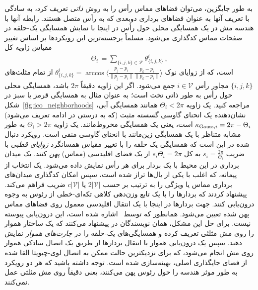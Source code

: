 به طور جایگزین، می‌توان فضاهای مماس رأس را به روش \emph{ذاتی} تعریف کرد، به سادگی با تعریف آنها به عنوان فضاهای برداری دوبعدی که به رأس متصل هستند.
رابطه آنها با هندسه مش در یک همسایگی محلی حول رأس در اینجا با نمایش همسایگی یک-حلقه در صفحات مماس کدگذاری می‌شود.
مسلماً برجسته‌ترین این رویکردها بر اساس تغییر مقیاس زاویه کل
\begin{align}\label{eq:mesh_total_incident_angle}
    \Theta_i \,=\! \sum_{\{i,j,k\}\in\mathcal{F}} \theta_{\{i,j,k\}}^i \,,
\end{align}
است، که از زوایای نوک
$\theta_{\{i,j,k\}}^i = \arccos \big\langle \frac{p_j-p_i}{\lVert p_j-p_i\rVert} \frac{p_k-p_i}{\lVert p_k-p_i\rVert} \big\rangle$
از تمام مثلث‌های $\{i,j,k\}$ مجاور رأس $i\in\mathcal{V}$ جمع می‌شود.
اگر این زاویه دقیقاً $2\pi$ باشد، همسایگی محلی حول رأس به طور ذاتی تخت است؛ به عنوان مثال به همسایگی قرمز یا سبز در شکل~\ref{fig:ico_neighborhoods} مراجعه کنید.
یک زاویه $\Theta_i < 2\pi$ همانند همسایگی آبی، نشان‌دهنده یک انحنای گاوسی گسسته مثبت (که به درستی در ادامه تعریف می‌شود) $\kappa_{\textup{Gauss},i} = 2\pi - \Theta_i$ است، یعنی یک همسایگی مخروط‌مانند.
یک زاویه $\Theta_i > 2\pi$ به طور مشابه متناظر با یک همسایگی زین‌مانند با انحنای گاوسی منفی است.
رویکرد دنبال شده در
\cite{polthier1998straightest,zhang2006vectorFieldDesign,Knoppel:2013:GOD,Sharp2019VectorHeatMethod,craneDiscreteDifferentialGeometry2014}
این است که همسایگی یک-حلقه را با تغییر مقیاس همسانگرد \emph{زوایای قطبی} با ضریب $s_i = \frac{2\pi}{\Theta_i}$ به کل $s_i \Theta_i = 2\pi$ از یک فضای اقلیدسی (مماس) \emph{پهن} کنند.
یک میدان برداری در این محیط با یک بردار برای هر رأس نمایش داده می‌شود.
یک انتخاب از پیمانه، که اغلب با یکی از یال‌ها تراز شده است، سپس امکان کدگذاری میدان‌های برداری مماس یا ویژگی را به ترتیب بر حسب $2|\mathcal{V}|$ یا $c|\mathcal{V}|$ ضریب فراهم می‌کند.
\citet{zhang2006vectorFieldDesign} پیشنهاد کردند که بردارها را با یک تابع وزن‌دهی کلاهی تکه‌ای-خطی از رئوس به وجوه درون‌یابی کنند.
جهت بردارها در اینجا با یک انتقال اقلیدسی معمول روی فضاهای مماس پهن شده تعیین می‌شود.
همانطور که توسط~\citet{deGoes2016VectorFieldProcessing} اشاره شده است، این درون‌یابی پیوسته نیست.
برای حل این مشکل، همان نویسندگان در \cite{liu2016discreteConnection} پیشنهاد می‌کنند که یک ساختار هموار را روی مش مثلثی تعریف کرده و همسایگی‌های یک-حلقه را در \emph{چارت‌های هموار} نمایش دهند.
سپس یک درون‌یابی هموار با انتقال بردارها از طریق یک اتصال سادکی هموار روی مش انجام می‌شود، که برای نزدیکترین حالت ممکن به اتصال لوی-چیویتا القا شده از فضای جایگذاری اصلی، بهینه‌سازی شده است.
توجه داشته باشید که هر دو رویکرد به طور موثر هندسه را حول رئوس پهن می‌کنند، یعنی دقیقاً روی مش مثلثی عمل نمی‌کنند.


